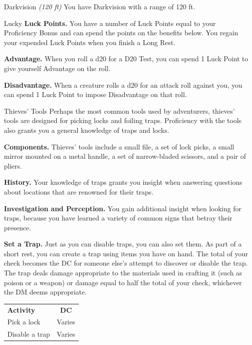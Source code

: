 \begin{Card}{Darkvision \textit{(120 ft)}}
You have Darkvision with a range of 120 ft.
\end{Card}


\begin{Card}{Lucky}
\textbf{Luck Points.} You have a number of Luck Points equal to your Proficiency Bonus and can spend the points on the benefits below. You regain your expended Luck Points when you finish a Long Rest.

\textbf{Advantage.} When you roll a d20 for a D20 Test, you can spend 1 Luck Point to give yourself Advantage on the roll.

\textbf{Disadvantage.} When a creature rolls a d20 for an attack roll against you, you can spend 1 Luck Point to impose Disadvantage on that roll.
\end{Card}

\begin{Card}{Thieves' Tools}
Perhaps the most common tools used by adventurers, thieves' tools are designed for picking locks and foiling traps. Proficiency with the tools also grants you a general knowledge of traps and locks.

\textbf{Components.} Thieves' tools include a small file, a set of lock picks, a small mirror mounted on a metal handle, a set of narrow-bladed scissors, and a pair of pliers.

\textbf{History.} Your knowledge of traps grants you insight when answering questions about locations that are renowned for their traps.

\textbf{Investigation and Perception.} You gain additional insight when looking for traps, because you have learned a variety of common signs that betray their presence.

\textbf{Set a Trap.} Just as you can disable traps, you can also set them. As part of a short rest, you can create a trap using items you have on hand. The total of your check becomes the DC for someone else's attempt to discover or disable the trap. The trap deals damage appropriate to the materials used in crafting it (such as poison or a weapon) or damage equal to half the total of your check, whichever the DM deems appropriate.

\begin{tabular}{lc}
\textbf{Activity} & \textbf{DC} \\
Pick a lock & Varies \\
Disable a trap & Varies \\
\end{tabular}
\end{Card}


